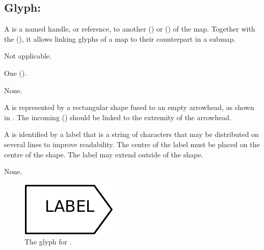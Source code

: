 \subsection{Glyph: }
\label{sec:tag}

A  is a named handle, or reference, to another  () or  () of the map.
Together with the  (), it allows linking glyphs of a map to their counterpart in a submap.

\begin{glyphDescription}

\glyphSboTerm Not applicable.

\glyphIncoming
One  ().

\glyphOutgoing
None.

\glyphContainer A  is represented by a rectangular shape fused to an empty arrowhead, as shown in .
The incoming  () should be linked to the extremity of the arrowhead.

\glyphLabel A  is identified by a label that is  a string of characters that may be distributed on several lines to improve readability.
The centre of the label must be placed on the centre of the shape.
The label may extend outside of the shape.

\glyphAux 
None.

\end{glyphDescription}

\begin{figure}[H]
  \centering
  \includegraphics{images/build/tag.pdf}
  \caption{The \PD glyph for .}
  \label{fig:tag}
\end{figure}
